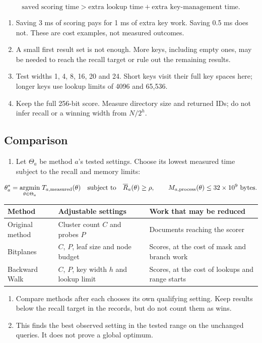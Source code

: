 \[
 \boxed{\text{saved scoring time}>
        \text{extra lookup time}+\text{extra key-management time}.}
\]
\begin{enumerate}[start=4]
\item Saving 3 ms of scoring pays for 1 ms of extra key work. Saving 0.5 ms does not. These are cost examples, not measured outcomes.
\item A small first result set is not enough. More keys, including empty ones, may be needed to reach the recall target or rule out the remaining results.
\item Test widths 1, 4, 8, 16, 20 and 24. Short keys visit their full key spaces here; longer keys use lookup limits of 4096 and 65,536.
\item Keep the full 256-bit score. Measure directory size and returned IDs; do not infer recall or a winning width from $N/2^h$.
\end{enumerate}

\subsection{Comparison}
\begin{enumerate}
\item Let $\Theta_a$ be method $a$'s tested settings. Choose its lowest measured time subject to the recall and memory limits:
\end{enumerate}

\[
 \theta_a^*=\underset{\theta\in\Theta_a}{\operatorname{argmin}}\;
 T_{a,\rm measured}(\theta)
 \quad\text{subject to}\quad
 \overline R_a(\theta)\ge\rho,\qquad
 M_{a,\rm process}(\theta)\le32\times10^9\text{ bytes}.
\]
\begin{center}\small
\begin{tabularx}{\linewidth}{@{}lYY@{}}\toprule
Method & Adjustable settings & Work that may be reduced\\\midrule
Original method & Cluster count $C$ and probes $P$ & Documents reaching the scorer\\
Bitplanes & $C$, $P$, leaf size and node budget & Scores, at the cost of mask and branch work\\
Backward Walk & $C$, $P$, key width $h$ and lookup limit & Scores, at the cost of lookups and range starts\\\bottomrule
\end{tabularx}\normalsize
\end{center}
\begin{enumerate}[start=2]
\item Compare methods after each chooses its own qualifying setting. Keep results below the recall target in the records, but do not count them as wins.
\item This finds the best observed setting in the tested range on the unchanged queries. It does not prove a global optimum.
\end{enumerate}
